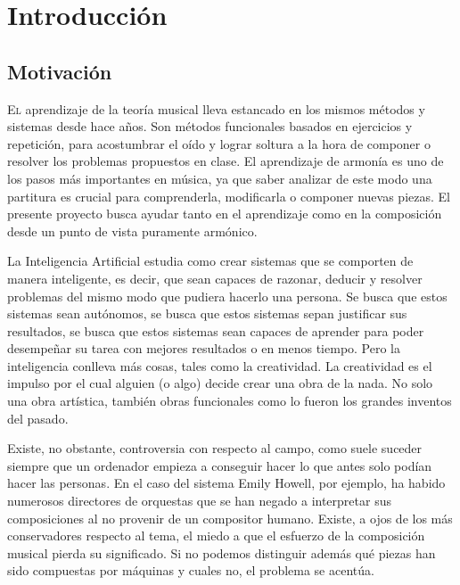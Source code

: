 \chapter{Introducción}
\label{chap:introduccion}


\section{Motivación}
 \label{sec:motivation}
  \lettrine{E}l aprendizaje de la teoría musical lleva estancado en los mismos métodos y sistemas desde hace años. Son métodos funcionales basados en ejercicios y repetición, para acostumbrar el oído y lograr soltura a la hora de componer o resolver los problemas propuestos en clase. El aprendizaje de armonía es uno de los pasos más importantes en música, ya que saber analizar de este modo una partitura es crucial para comprenderla, modificarla o componer nuevas piezas. El presente proyecto busca ayudar tanto en el aprendizaje como en la composición desde un punto de vista puramente armónico. 
 
 La Inteligencia Artificial estudia como crear sistemas que se comporten de manera inteligente, es decir, que sean capaces de razonar, deducir y resolver problemas del mismo modo que pudiera hacerlo una persona. Se busca que estos sistemas sean autónomos, se busca que estos sistemas sepan justificar sus resultados, se busca que estos sistemas sean capaces de aprender para poder desempeñar su tarea con mejores resultados o en menos tiempo. Pero la inteligencia conlleva más cosas, tales como la creatividad. La creatividad es el impulso por el cual alguien (o algo) decide crear una obra de la nada. No solo una obra artística, también obras funcionales como lo fueron los grandes inventos del pasado. 
 
 Existe, no obstante, controversia con respecto al campo, como suele suceder siempre que un ordenador empieza a conseguir hacer lo que antes solo podían hacer las personas. En el caso del sistema Emily Howell, por ejemplo, ha habido numerosos directores de orquestas que se han negado a interpretar sus composiciones al no provenir de un compositor humano. Existe, a ojos de los más conservadores respecto al tema, el miedo a que el esfuerzo de la composición musical pierda su significado. Si no podemos distinguir además qué piezas han sido compuestas por máquinas y cuales no, el problema se acentúa. 
 
